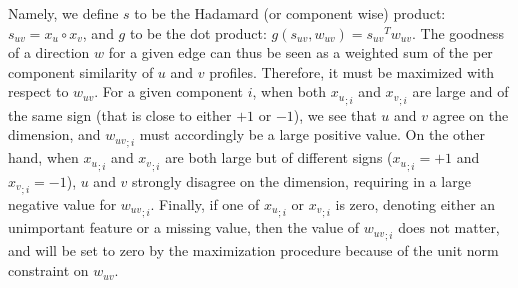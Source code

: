 Namely, we define $s$ to be the Hadamard (or component wise) product: $s_{uv} = x_u \circ x_v$, and
$g$ to be the dot product: $g(s_{uv}, w_{uv}) = {s_{uv}}^T w_{uv}$. The goodness of a direction $w$
for a given edge can thus be seen as a weighted sum of the per component similarity of $u$ and $v$
profiles. Therefore, it must be maximized with respect to $w_{uv}$. For a given component $i$, when
both ${x_u}_{;i}$ and ${x_v}_{;i}$ are large and of the same sign (that is close to either $+1$ or
$-1$), we see that $u$ and $v$ agree on the \ith{} dimension, and ${w_{uv}}_{;i}$ must accordingly
be a large positive value. On the other hand, when ${x_u}_{;i}$ and ${x_v}_{;i}$ are both large but
of different signs (\eg ${x_u}_{;i} = +1$ and ${x_v}_{;i} = -1$), $u$ and $v$ strongly disagree on
the \ith{} dimension, requiring in a large negative value for ${w_{uv}}_{;i}$.  Finally, if one of
${x_u}_{;i}$ or ${x_v}_{;i}$ is zero, denoting either an unimportant feature or a missing value,
then the value of ${w_{uv}}_{;i}$ does not matter, and will be set to zero by the maximization
procedure because of the unit norm constraint on $w_{uv}$.

\iffalse
\begin{aside}
When $s$ is a distance, and therefore positive, we impose $w_{uv}\geq 0$. A link $(u,v)$ is then
well explained by $w_{uv}$ when observed differences along this direction are small. More precisely,
when the quantity ${s_{uv}}^T w_{uv}$ is close to zero. Because $w_{uv}$ is unit norm, the \ith{}
component of $w_{uv}$ should be large when the \ith{} feature of $x_u$ and $x_v$ are close. Hence, a
null value for a component $i$ of $s_{uv}$ should not mean anything else than $u$ and $v$ share a
known and similar feature $i$ (\eg{} the unknown value should be different from $0$). When $s$ is
the difference $x_u - x_v$, it can be negative and the same reasoning can be applied, but with
$w_{uv}\in [-1,1]^d$ and a link value of $\left({s_{uv}}^T w_{uv}\right)^2$.

An alternative is to consider that the combination is a similarity. Links are created when the
observed similarity is high. Again, if $s$ is positive, it seems reasonable to impose that
$w_{uv}\geq0$ (and if $s$ can be negative, then $w_{uv}$ should be in $[-1,1]$). One main advantage
of similarities is maybe to avoid (or minimize) problems with missing values setting them to 0.
\end{aside}
\fi

\medskip

